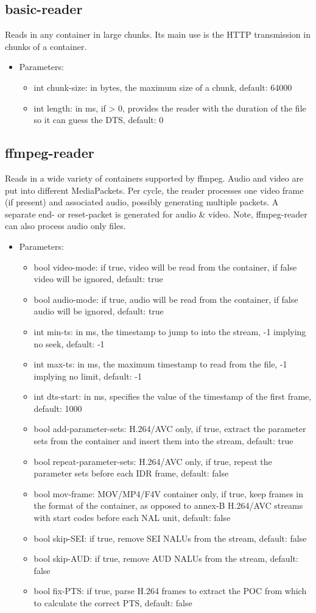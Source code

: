 \subsection{basic-reader}
Reads in any container in large chunks. Its main use is the HTTP transmission in chunks of a container.
\begin{itemize}
\item Parameters:
\begin{itemize}
\item int chunk-size: in bytes, the maximum size of a chunk, default: 64000
\item int length: in ms, if > 0, provides the reader with the duration of the file so it can guess the DTS, default: 0
\end{itemize}
\end{itemize}
\subsection{ffmpeg-reader}
Reads in a wide variety of containers supported by ffmpeg. Audio and video are put into different MediaPackets. Per cycle, the reader processes one video frame (if present) and associated audio, possibly generating multiple packets. A separate end- or reset-packet is generated for audio \& video. Note, ffmpeg-reader can also process audio only files.
\begin{itemize}
\item Parameters:
\begin{itemize}
\item bool video-mode: if true, video will be read from the container, if false video will be ignored, default: true
\item bool audio-mode: if true, audio will be read from the container, if false audio will be ignored, default: true
\item int min-ts: in ms, the timestamp to jump to into the stream, -1 implying no seek, default: -1
\item int max-ts: in ms, the maximum timestamp to read from the file, -1 implying no limit, default: -1
\item int dts-start: in ms, specifies the value of the timestamp of the first frame, default: 1000
\item bool add-parameter-sets: H.264/AVC only, if true, extract the parameter sets from the container and insert them into the stream, default: true
\item bool repeat-parameter-sets: H.264/AVC only, if true, repeat the parameter sets before each IDR frame, default: false
\item bool mov-frame: MOV/MP4/F4V container only, if true, keep frames in the format of the container, as opposed to annex-B H.264/AVC streams with start codes before each NAL unit, default: false
\item bool skip-SEI: if true, remove SEI NALUs from the stream, default: false
\item bool skip-AUD: if true, remove AUD NALUs from the stream, default: false
\item bool fix-PTS: if true, parse H.264 frames to extract the POC from which to calculate the correct PTS, default: false
\end{itemize}
\end{itemize}
\newpage
